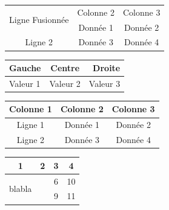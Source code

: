\documentclass[a4paper,12pt]{article} %
\begin{document}
\vspace{1cm} %

\begin{tabular}{|c|c|c|}
\hline
\multirow{2}{*}{Ligne Fusionnée} & Colonne 2 & Colonne 3 \\ %
\cline{2-3} %
                                  & Donnée 1  & Donnée 2 \\
\hline
Ligne 2 & Donnée 3 & Donnée 4 \\
\hline
\end{tabular}

\vspace{1cm} %

\begin{tabular}{|l|c|r|}
\hline
Gauche & Centre & Droite \\ %
\hline
Valeur 1 & Valeur 2 & Valeur 3 \\ %
\hline
\end{tabular}

\vspace{1cm} %

\begin{tabular}{|c|c|c|}
\hline
Colonne 1 & Colonne 2 & Colonne 3 \\
\hline
Ligne 1 & Donnée 1 & Donnée 2 \\
\cline{1-2} %
Ligne 2 & Donnée 3 & Donnée 4 \\
\hline
\end{tabular}

\begin{tabular}{|c|c|c|c|}
\hline
1 & 2 & 3 & 4 \\ %
\hline
\multirow{2}{*}{blabla} &   & 6 & 10 \\ %
\cline{3-4} %
                    &   & 9 & 11 \\ %
\hline
\end{tabular}
\end{document}
